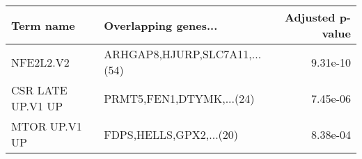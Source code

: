 \begin{tabular}{llr}
\toprule
        Term name &          Overlapping genes... &  Adjusted p-value \\
\midrule
        NFE2L2.V2 & ARHGAP8,HJURP,SLC7A11,...(54) &          9.31e-10 \\
CSR LATE UP.V1 UP &      PRMT5,FEN1,DTYMK,...(24) &          7.45e-06 \\
    MTOR UP.V1 UP &       FDPS,HELLS,GPX2,...(20) &          8.38e-04 \\
\bottomrule
\end{tabular}
